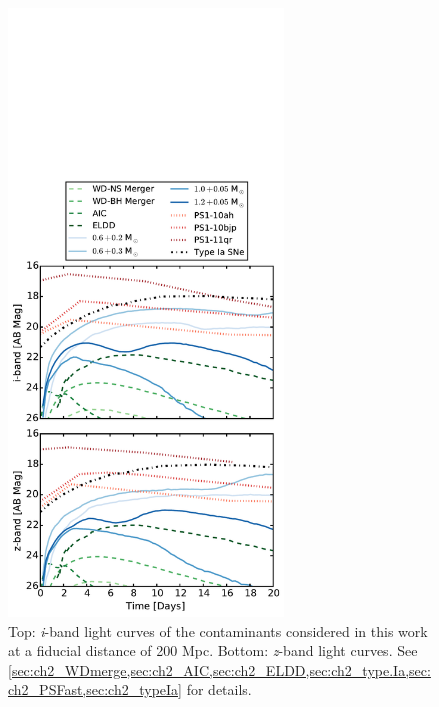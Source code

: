 \clearpage
\begin{figure}[h!]
\centering
\includegraphics[width=0.65\textwidth]{./figs/chapter2/ch2_f2.pdf}
\caption{Top: {\em i}-band light curves of the contaminants considered in this work at a fiducial distance of 200 Mpc. Bottom: {\em z}-band light curves. See \cref{sec:ch2_WDmerge,sec:ch2_AIC,sec:ch2_ELDD,sec:ch2_type.Ia,sec:ch2_PSFast,sec:ch2_typeIa} for details.}
\label{fig:ch2_LCcont}
\end{figure}

